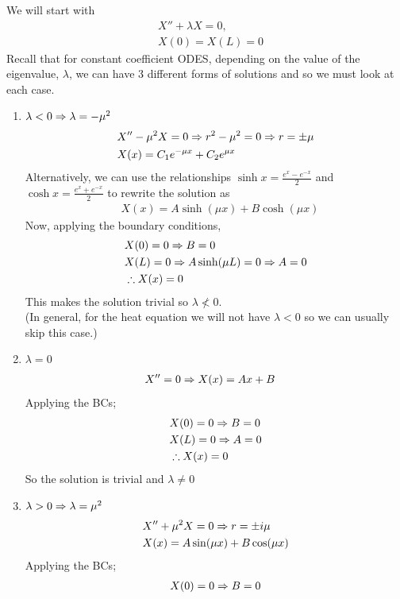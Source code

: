 \documentclass[11pt, fleqn]{article}
\begin{document}
We will start with
\begin{align*}
    &X''+\lambda X=0,\\
    &X(0)=X(L)=0
\end{align*}
Recall that for constant coefficient ODES, depending on the value of the eigenvalue, $\lambda$, we can have 3 different forms of solutions and so we must look at each case.
\begin{enumerate}
    \item $\lambda<0\Rightarrow \lambda=-\mu^2$
    \begin{align*}
        &X''-\mu^2X=0\Rightarrow r^2-\mu^2=0\Rightarrow r=\pm\mu\\
        &X(x)=C_1e^{-\mu x}+C_2e^{\mu x}
    \end{align*}
    Alternatively, we can use the relationships $\sinh x=\frac{e^x-e^{-x}}{2}$ and $\cosh x=\frac{e^x+e^{-x}}{2}$ to rewrite the solution as
    \begin{align*}
        &X(x)=A\sinh(\mu x)+B\cosh(\mu x)
    \end{align*}
    Now, applying the boundary conditions,
    \begin{align*}
        &X(0)=0\Rightarrow B=0\\
        &X(L)=0\Rightarrow A\sinh(\mu L)=0\Rightarrow A=0\\
        &\therefore X(x)=0
    \end{align*}
    This makes the solution trivial so $\lambda\nless0$.\\
    (In general, for the heat equation we will not have $\lambda<0$ so we can usually skip this case.)
    \item $\lambda=0$
    \begin{align*}
        &X''=0\Rightarrow X(x)=Ax+B
    \end{align*}
    Applying the BCs;
    \begin{align*}
        &X(0)=0\Rightarrow B=0\\
        &X(L)=0\Rightarrow A=0\\
        &\therefore X(x)=0
    \end{align*}
    So the solution is trivial and $\lambda\neq 0$
    \item $\lambda>0\Rightarrow \lambda=\mu^2$
    \begin{align*}
        &X''+\mu^2X=0\Rightarrow r=\pm i\mu\\
        &X(x)=A\sin(\mu x)+B\cos(\mu x)
    \end{align*}
    Applying the BCs;
    \begin{align*}
        &X(0)=0\Ra B=0\\

\end{align*}
\end{enumerate}
\end{document}
